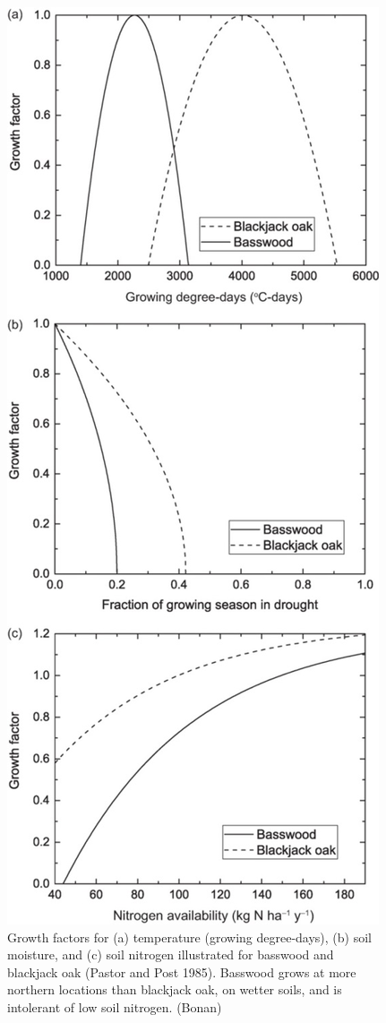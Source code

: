 \documentclass[12pt,oneside]{book}
\begin{document}
\begin{figure}

{\centering \includegraphics[width=0.8\linewidth]{figures/chap6/f625_growth_factorbis} 

}

\caption{Growth factors for (a) temperature (growing degree-days), (b) soil moisture, and (c) soil nitrogen illustrated for basswood and blackjack oak (Pastor and Post 1985). Basswood grows at more northern locations than blackjack oak, on wetter soils, and is intolerant of low soil nitrogen. (Bonan)}\label{fig:f625}
\end{figure}
\end{document}

